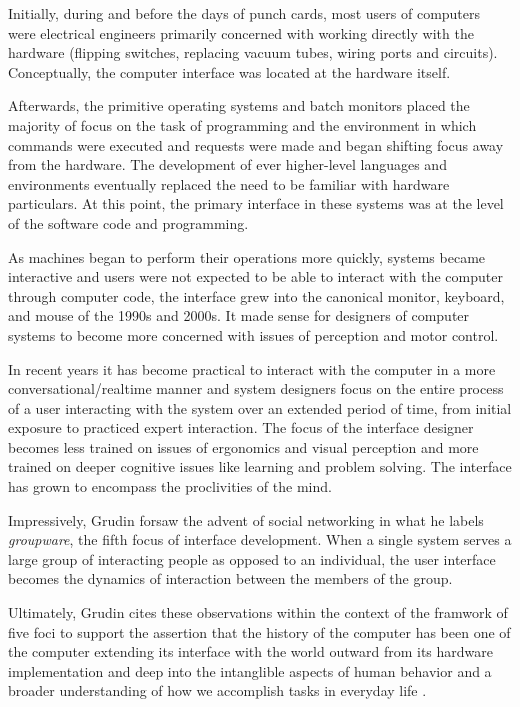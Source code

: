 Initially, during and before the days of punch cards, most users of computers were electrical engineers primarily concerned with working directly with the hardware (flipping switches, replacing vacuum tubes, wiring ports and circuits). Conceptually, the computer interface was located at the hardware itself. 

Afterwards, the primitive operating systems and batch monitors placed the majority of focus on the task of programming and the environment in which commands were executed and requests were made and began shifting focus away from the hardware. The development of ever higher-level languages and environments eventually replaced the need to be familiar with hardware particulars. At this point, the primary interface in these systems was at the level of the software code and programming. 

As machines began to perform their operations more quickly, systems became interactive and users were not expected to be able to interact with the computer through computer code, the interface grew into the canonical monitor, keyboard, and mouse of the 1990s and 2000s. It made sense for designers of computer systems to become more concerned with issues of perception and motor control. 

In recent years it has become practical to interact with the computer in a more conversational/realtime manner and system designers focus on the entire process of a user interacting with the system over an extended period of time, from initial exposure to practiced expert interaction. The focus of the interface designer becomes less trained on issues of ergonomics and visual perception and more trained on deeper cognitive issues like learning and problem solving. The interface has grown to encompass the proclivities of the mind. 

Impressively, Grudin forsaw the advent of social networking in what he labels \emph{groupware}, the fifth focus of interface development. When a single system serves a large group of interacting people as opposed to an individual, the user interface becomes the dynamics of interaction between the members of the group.

Ultimately, Grudin cites these observations within the context of the framwork of five foci to support the assertion that the history of the computer has been one of the computer extending its interface with the world outward from its hardware implementation and deep into the intanglible aspects of human behavior and a broader understanding of how we accomplish tasks in everyday life \cite{continuity1990}.

